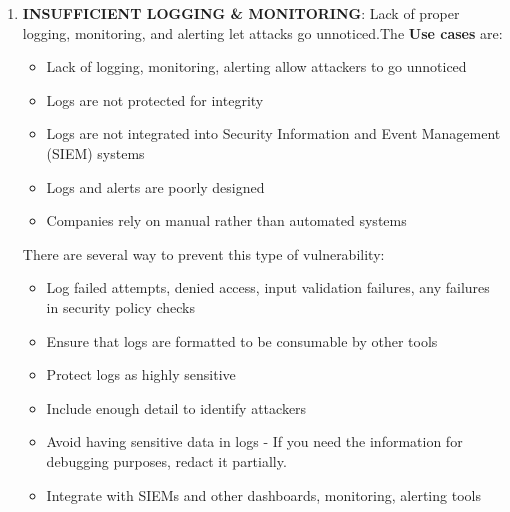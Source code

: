 \documentclass[10pt,a4paper]{report}
\begin{document}
\begin{enumerate}
	\item \textbf {INSUFFICIENT LOGGING \& MONITORING}: Lack of proper logging, monitoring, and alerting let attacks go unnoticed.The \textbf{Use cases} are:
	\begin{itemize}
		\item Lack of logging, monitoring, alerting allow attackers to go unnoticed
		\item Logs are not protected for integrity
		\item Logs are not integrated into Security Information and Event
		Management (SIEM) systems
		\item Logs and alerts are poorly designed
		\item Companies rely on manual rather than automated systems
	\end{itemize}
	There are several way to prevent this type of vulnerability:
	\begin{itemize}
		\item Log failed attempts, denied access, input validation failures, any
		failures in security policy checks
		\item Ensure that logs are formatted to be consumable by other tools
		\item  Protect logs as highly sensitive
		\item  Include enough detail to identify attackers
		\item  Avoid having sensitive data in logs - If you need the information for
		debugging purposes, redact it partially.
		\item  Integrate with SIEMs and other dashboards, monitoring, alerting
		tools
		
	\end{itemize}
\end{enumerate}
\end{document}
